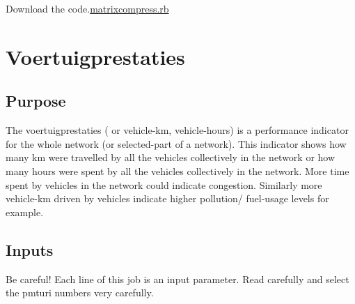 \documentclass[
  letterpaper,
  DIV=11,
  numbers=noendperiod]{scrreprt}
\begin{document}
Download the code.\href{../first.rb}{matrixcompress.rb}

\chapter{Voertuigprestaties}\label{voertuigprestaties}

\section{Purpose}

The voertuigprestaties ( or vehicle-km, vehicle-hours) is a performance
indicator for the whole network (or selected-part of a network). This
indicator shows how many km were travelled by all the vehicles
collectively in the network or how many hours were spent by all the
vehicles collectively in the network. More time spent by vehicles in the
network could indicate congestion. Similarly more vehicle-km driven by
vehicles indicate higher pollution/ fuel-usage levels for example.

\section{Inputs}

\begin{tcolorbox}[enhanced jigsaw, bottomtitle=1mm, title=\textcolor{quarto-callout-important-color}{\faExclamation}\hspace{0.5em}{Important}, rightrule=.15mm, toptitle=1mm, colbacktitle=quarto-callout-important-color!10!white, opacitybacktitle=0.6, leftrule=.75mm, opacityback=0, coltitle=black, colframe=quarto-callout-important-color-frame, toprule=.15mm, titlerule=0mm, breakable, bottomrule=.15mm, arc=.35mm, colback=white, left=2mm]

Be careful! Each line of this job is an input parameter. Read carefully
and select the pmturi numbers very carefully.

\end{tcolorbox}
\end{document}
